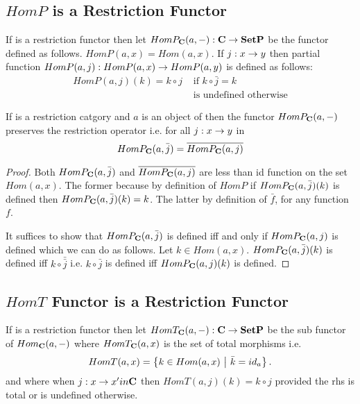 \documentclass[10pt,a4paper]{article}
\theoremstyle{remark}
\begin{document}
\subsection{$HomP$ is a Restriction Functor}
If \catcw is a restriction functor then
let $HomP_{\textbf{C}}(a,-): \textbf{C} \rightarrow \textbf{SetP}$ be the  functor
defined as follows. $HomP(a,x)=Hom(a,x)$.
If $j: x \rightarrow y$ then partial function $HomP(a,j): HomP(a,x) \rightarrow HomP(a,y)$
is defined as follows:
\begin{align*}
HomP(a,j)(k) = k \circ j &\mbox{ if $k \circ \bar{j} = k$} \\
                         & \mbox{ is undefined otherwise}
\end{align*}
\begin{lemma}
If \catcw is a restriction catgory and $a$ is an object of \catcw 
then the functor $HomP_{\textbf{C}}(a,-)$ preserves the restriction operator i.e.
for all $j:x \rightarrow y$ in \catc
$$HomP_{\textbf{C}}(a,\bar{j})=\overline{HomP_{\textbf{C}}(a,j)}$$
\end{lemma}
\begin{proof}
Both $HomP_{\textbf{C}}(a,\bar{j})$ and $\overline{HomP_{\textbf{C}}(a,j)}$ are less than id function on the set $Hom(a,x)$. 
The former because by definition of $HomP$ 
if $HomP_{\textbf{C}}(a,\bar{j})(k)$ is defined then $HomP_{\textbf{C}}(a,\bar{j})(k)=k$.
The latter by definition of $\bar{f}$, for any function $f$.

It suffices to show that $HomP_{\textbf{C}}(a,\bar{j})$ is defined iff and only if
$HomP_{\textbf{C}}(a,j)$ is defined which we can do as follows.
 Let $k \in Hom(a,x)$. $HomP_{\textbf{C}}(a,\bar{j})(k)$
is defined iff $k \circ \bar{\bar{j}}$ i.e. $k \circ \bar{j}$ is defined
iff $HomP_{\textbf{C}}(a,j)(k)$ is defined. 
\end{proof}

\subsection{$HomT$ Functor is a Restriction Functor}
If \catcw is a restriction functor then
let $HomT_{\textbf{C}}(a,-): \textbf{C} \rightarrow \textbf{SetP}$ be the sub functor of $Hom_{\textbf{C}}(a,-)$
where $HomT_{\textbf{C}}(a,x)$ is the set of total morphisms i.e.
$$HomT(a,x)=\left\{k \in Hom(a,x) \ \middle|\ \bar{k}=id_a\right\}.$$
and where when $j:x \rightarrow x' in \textbf{C}$ then $HomT(a,j)(k)=k \circ j$ provided the rhs is total or is undefined otherwise.  
 
\end{document}
